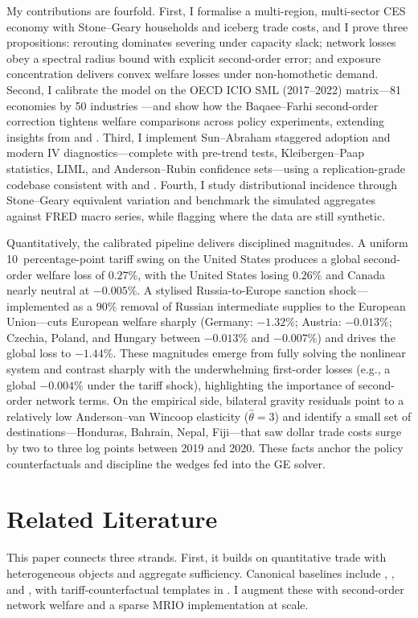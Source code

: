 \documentclass[12pt]{article}
\begin{document}
My contributions are fourfold. First, I formalise a multi-region, multi-sector CES economy with Stone--Geary households and iceberg trade costs, and I prove three propositions: rerouting dominates severing under capacity slack; network losses obey a spectral radius bound with explicit second-order error; and exposure concentration delivers convex welfare losses under non-homothetic demand. Second, I calibrate the model on the OECD ICIO SML (2017--2022) matrix---81 economies by 50 industries \citep{OECDICIO2023}---and show how the Baqaee--Farhi second-order correction tightens welfare comparisons across policy experiments, extending insights from \citet{BaqaeeFarhi2019} and \citet{CaliendoParro2015}. Third, I implement Sun--Abraham staggered adoption and modern IV diagnostics---complete with pre-trend tests, Kleibergen--Paap statistics, LIML, and Anderson--Rubin confidence sets---using a replication-grade codebase consistent with \citet{SunAbraham2021} and \citet{CameronGelbachMiller2011,KleibergenPaap2006,AndersonRubin1949}. Fourth, I study distributional incidence through Stone--Geary equivalent variation and benchmark the simulated aggregates against FRED macro series, while flagging where the data are still synthetic.

Quantitatively, the calibrated pipeline delivers disciplined magnitudes. A uniform 10~percentage-point tariff swing on the United States produces a global second-order welfare loss of $0.27\%$, with the United States losing $0.26\%$ and Canada nearly neutral at $-0.005\%$. A stylised Russia-to-Europe sanction shock---implemented as a $90\%$ removal of Russian intermediate supplies to the European Union---cuts European welfare sharply (Germany: $-1.32\%$; Austria: $-0.013\%$; Czechia, Poland, and Hungary between $-0.013\%$ and $-0.007\%$) and drives the global loss to $-1.44\%$. These magnitudes emerge from fully solving the nonlinear system and contrast sharply with the underwhelming first-order losses (e.g., a global $-0.004\%$ under the tariff shock), highlighting the importance of second-order network terms. On the empirical side, bilateral gravity residuals point to a relatively low Anderson--van Wincoop elasticity ($\hat{\theta}=3$) and identify a small set of destinations---Honduras, Bahrain, Nepal, Fiji---that saw dollar trade costs surge by two to three log points between 2019 and 2020. These facts anchor the policy counterfactuals and discipline the wedges fed into the GE solver.

\section{Related Literature}
This paper connects three strands. First, it builds on quantitative trade with heterogeneous objects and aggregate sufficiency. Canonical baselines include \citet{EK2002}, \citet{Melitz2003}, and \citet{ACR2012}, with tariff-counterfactual templates in \citet{CaliendoParro2015}. I augment these with second-order network welfare \citep{BaqaeeFarhi2019} and a sparse MRIO implementation at scale.
\end{document}
